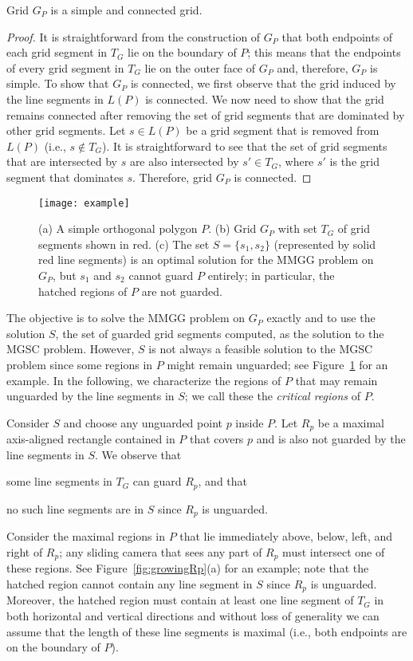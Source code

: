 \documentclass{llncs}
\begin{document}
\begin{lemma}
\label{lem:gIsSimple}Grid $G_P$ is a simple and connected grid.
\end{lemma}
\begin{proof}
It is straightforward from the construction of $G_P$ that both endpoints of each grid
segment in $T_G$ lie on the boundary of $P$; this means that the endpoints of every grid
segment in $T_G$ lie on the outer face of $G_P$ and, therefore, $G_P$ is simple. To show that $G_P$
is connected, we first observe that the grid induced by the line segments in $L(P)$ is connected.
We now need to show that the grid remains connected after removing the set of grid
segments that are dominated by other grid segments. Let $s\in L(P)$ be a grid segment
that is removed from $L(P)$ (i.e., $s\notin T_G$). It is straightforward to see that the set of
grid segments that are intersected by $s$ are also intersected by $s'\in T_G$, where $s'$
is the grid segment that dominates $s$. Therefore, grid $G_P$ is connected.
\end{proof}
\begin{figure}[t]
\centering \texttt{[image: example]}
\caption{(a) A simple orthogonal polygon $P$.
(b) Grid $G_P$ with set $T_G$ of grid segments shown in red. (c) The set
$S=\{s_1, s_2\}$ (represented by solid red line segments) is an optimal solution for the MMGG problem
on $G_P$, but $s_1$ and $s_2$ cannot guard $P$ entirely; in particular, the hatched regions of $P$ are not guarded.}
\label{fig:notEquivalent}\end{figure}

The objective is to solve the MMGG problem on $G_P$ exactly
and to use the solution $S$, the set of guarded grid segments computed, as the solution to the MGSC problem.
However, $S$ is not always a feasible solution to the MGSC problem since some regions in $P$
might remain unguarded; see Figure~\ref{fig:notEquivalent}
for an example. In the following, we characterize the regions of $P$ that may remain unguarded by the line segments in $S$;
we call these the \emph{critical regions} of $P$.

Consider $S$ and choose any unguarded point $p$ inside $P$. Let $R_p$ be a maximal axis-aligned
rectangle contained in $P$ that
covers $p$ and is also not guarded by the line segments in $S$. We observe that \begin{inparaenum}[(i)]\item some line segments
in $T_G$ can guard $R_p$,
and that \item no such line segments are in $S$ since $R_p$ is unguarded. \end{inparaenum} 
Consider the maximal regions in $P$ that lie immediately above, below, left, and right of $R_p$;
any sliding camera that sees any part of $R_p$ must intersect one of these regions.
See Figure~\ref{fig:growingRp}(a) for an example; note that the hatched region
cannot contain any line segment in $S$ since $R_p$ is unguarded. Moreover, the hatched region must contain at least one line segment
of $T_G$ in both horizontal and vertical directions and without loss of generality we can assume that the length of these
line segments is maximal (i.e., both endpoints are on the boundary of $P$).
\end{document}
